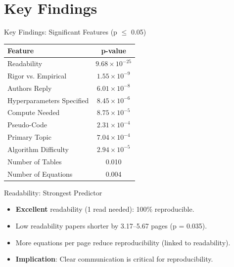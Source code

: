 \documentclass[10pt]{beamer}
\begin{document}
\section{Key Findings}

\begin{frame}{Key Findings: Significant Features (p $\leq$ 0.05)}
    \begin{table}
        \centering
        \footnotesize
        \begin{tabular}{l c}
            \toprule
            Feature & p-value \\
            \midrule
            Readability & $9.68 \times 10^{-25}$ \\
            Rigor vs. Empirical & $1.55 \times 10^{-9}$ \\
            Authors Reply & $6.01 \times 10^{-8}$ \\
            Hyperparameters Specified & $8.45 \times 10^{-6}$ \\
            Compute Needed & $8.75 \times 10^{-5}$ \\
            Pseudo-Code & $2.31 \times 10^{-4}$ \\
            Primary Topic & $7.04 \times 10^{-4}$ \\
            Algorithm Difficulty & $2.94 \times 10^{-5}$ \\
            Number of Tables & 0.010 \\
            Number of Equations & 0.004 \\
            \bottomrule
        \end{tabular}
    \end{table}
\end{frame}

\begin{frame}{Readability: Strongest Predictor}
    \begin{itemize}
        \item \textbf{Excellent} readability (1 read needed): 100\% reproducible.
        \item Low readability papers shorter by 3.17--5.67 pages (p = 0.035).
        \item More equations per page reduce reproducibility (linked to readability).
        \item \textbf{Implication}: Clear communication is critical for reproducibility.
    \end{itemize}
\end{frame}
\end{document}
